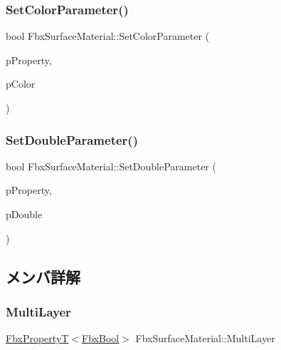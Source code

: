 \subsubsection{\texorpdfstring{Set\+Color\+Parameter()}{SetColorParameter()}}
{\footnotesize\ttfamily bool Fbx\+Surface\+Material\+::\+Set\+Color\+Parameter (\begin{DoxyParamCaption}\item[{\hyperlink{class_fbx_property}{Fbx\+Property}}]{p\+Property,  }\item[{\hyperlink{class_fbx_color}{Fbx\+Color} const \&}]{p\+Color }\end{DoxyParamCaption})\hspace{0.3cm}{\ttfamily [protected]}}

\mbox{\label{class_fbx_surface_material_a5d2b4164f67106f295a456f68b6d3bf2}} 
\subsubsection{\texorpdfstring{Set\+Double\+Parameter()}{SetDoubleParameter()}}
{\footnotesize\ttfamily bool Fbx\+Surface\+Material\+::\+Set\+Double\+Parameter (\begin{DoxyParamCaption}\item[{\hyperlink{class_fbx_property}{Fbx\+Property}}]{p\+Property,  }\item[{double}]{p\+Double }\end{DoxyParamCaption})\hspace{0.3cm}{\ttfamily [protected]}}



\subsection{メンバ詳解}
\mbox{\label{class_fbx_surface_material_ad62451d6f09f73c151a9f43f9349cd31}} 
\subsubsection{\texorpdfstring{Multi\+Layer}{MultiLayer}}
{\footnotesize\ttfamily \hyperlink{class_fbx_property_t}{Fbx\+PropertyT}$<$\hyperlink{fbxtypes_8h_a92e0562b2fe33e76a242f498b362262e}{Fbx\+Bool}$>$ Fbx\+Surface\+Material\+::\+Multi\+Layer}



